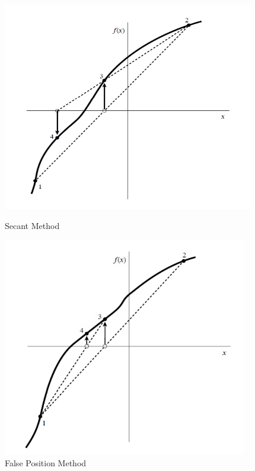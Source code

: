 \begin{figure}
    \centering
    \begin{minipage}{0.45\textwidth}
        \centering
        \includegraphics[width=\textwidth]{image/secantmethod.png}
        \caption{Secant Method}
        \label{fig:secantmethod}
    \end{minipage}\hfill
    \begin{minipage}{0.45\textwidth}
        \centering
        \includegraphics[width=\textwidth]{image/falsepositionmethod.png}
        \caption{False Position Method}
        \label{fig:falsepositionmethod}
    \end{minipage}
\end{figure}

